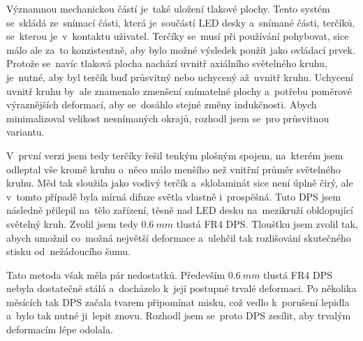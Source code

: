 Významnou mechanickou částí je~také uložení tlakové plochy.
Tento systém se~skládá ze~snímací části, která je~součástí LED desky a~snímané části, terčíků, se~kterou je~v~kontaktu uživatel.
Terčíky se~musí při používání pohybovat, sice málo ale za~to konzistentně, aby bylo možné výsledek použít jako ovládací prvek.
Protože se~navíc tlaková plocha nachází uvnitř axiálního světelného kruhu, je~nutné, aby byl terčík buď průsvitný nebo uchycený až~uvnitř kruhu.
Uchycení uvnitř kruhu by~ale znamenalo zmenšení snímatelné plochy a~potřebu poměrově výraznějších deformací, aby se~dosáhlo stejné změny indukčnosti.
Abych minimalizoval velikost nesnímaných okrajů, rozhodl jsem se~pro průsvitnou variantu.

V~první verzi jsem tedy terčíky řešil tenkým plošným spojem, na~kterém jsem odleptal vše kromě kruhu o~něco málo menšího než vnitřní průměr světelného kruhu.
Měd tak sloužila jako vodivý terčík a~sklolaminát sice není úplně čirý, ale v~tomto případě byla mírná difuze světla vlastně i~prospěšná.
Tuto DPS jsem následně přilepil na~tělo zařízení, těsně nad LED desku na~mezikruží obklopující světelný kruh.
Zvolil jsem tedy \(0.6~mm\) tlustá FR4 DPS.
Tloušťku jsem zvolil tak, abych umožnil co~možná největší deformace a~ulehčil tak rozlišování skutečného stisku od~nežádoucího šumu.

Tato metoda však měla pár nedostatků.
Především \(0.6~mm\) tlustá FR4 DPS nebyla dostatečně stálá a~docházelo k~její postupné trvalé deformaci.
Po několika měsících tak DPS začala tvarem připomínat misku, což vedlo k~porušení lepidla a~bylo tak nutné ji~lepit znovu.
Rozhodl jsem se~proto DPS zesílit, aby trvalým deformacím lépe odolala.





